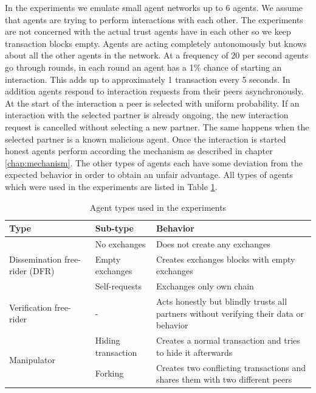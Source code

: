 
In the experiments we emulate small agent networks up to 6 agents. We assume that agents are trying to perform 
interactions with each other. The experiments are not concerned with the actual trust agents have 
in each other so we keep transaction blocks empty. Agents are acting completely autonomously 
but knows about all the other agents in the network. At a frequency of 20 per second agents go through
rounds, in each round an agent has a 1\% chance of starting an interaction. This adds up to approximately
1 transaction every 5 seconds. In addition agents respond to interaction requests from their peers 
asynchronously. At the start of the interaction a peer is selected with uniform probability. If an
interaction with the selected partner is already ongoing, the new interaction request is cancelled
without selecting a new partner. The same happens when the selected partner is a known malicious 
agent. Once the interaction is started honest agents perform according the mechanism as described in
chapter \ref{chap:mechanism}. The other types of agents each have some deviation from the expected
behavior in order to obtain an unfair advantage. All types of agents which were used in the experiments
are listed in Table \ref{tab:agent_types}.

\begin{table}
    \caption{Agent types used in the experiments}
    \label{tab:agent_types}
    \begin{tabular}{p{3cm}|p{3cm}|p{8cm}}
    \textbf{Type} & \textbf{Sub-type} & \textbf{Behavior} \\ \hline \hline
    \multirow{3}{3cm}{ Dissemination free-rider (DFR) } & No exchanges & Does not create any exchanges \\ \cline{2-3}
    & Empty exchanges & Creates exchanges blocks with empty exchanges \\ \cline{2-3}
    & Self-requests & Exchanges only own chain \\ \hline
    Verification free-rider & - & Acts honestly but blindly trusts all partners without verifying their data or behavior \\ \hline
    \multirow{2}{3cm}{ Manipulator } & Hiding transaction & Creates a normal transaction and tries to hide it afterwards \\ \cline{2-3}
    & Forking & Creates two conflicting transactions and shares them with two different peers \\ \hline
    \end{tabular}
\end{table}
    

